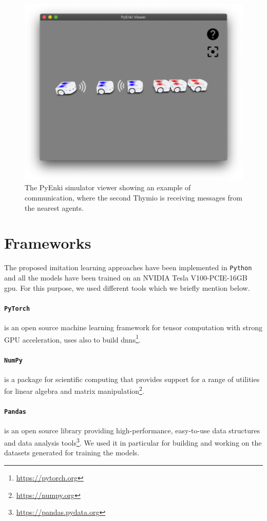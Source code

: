 \begin{figure}[!htb]
	\centering
	\includegraphics[width=.6\textwidth]{contents/images/thymio-comm}
	\caption[Example of communication with the PyEnki simulator]{The PyEnki 
	simulator viewer showing an example of communication, 
	where the second Thymio is receiving messages from the nearest agents.}
	\label{fig:thymio comm}
\end{figure}

\section{Frameworks}
\label{sec:learning}
The proposed imitation learning approaches have been implemented in 
\texttt{Python} and all the models have been trained on an NVIDIA Tesla 
V100-PCIE-16GB \gls{gpu}.
For this purpose, we used different tools which we briefly mention below.

\paragraph*{\texttt{PyTorch}} is an open source machine learning framework  for 
tensor computation with strong GPU acceleration, uses also to build 
\glspl{dnn}\footnote{\url{https://pytorch.org}}.

\paragraph*{\texttt{NumPy}} is a package for scientific computing that provides 
support for a range of utilities for linear algebra and matrix 
manipulation\footnote{\url{https://numpy.org}}.

\paragraph*{\texttt{Pandas}} is an open source library providing 
high-performance, easy-to-use data structures and data analysis 
tools\footnote{\url{https://pandas.pydata.org}}. We used it in particular for 
building 
and working on the datasets generated for training the models. 

